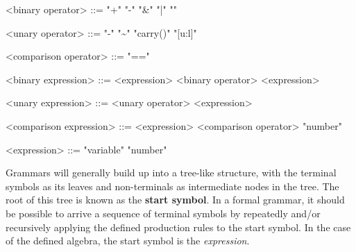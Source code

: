 \setlength{\grammarparsep}{0.25cm}   %
\setlength{\grammarindent}{4.5cm}
\begin{center}
\begin{grammar}
    <binary operator> ::= "+" \alt "-" \alt "\&" \alt "|" \alt "\bigoplus"

    <unary operator> ::= "-" \alt "\sim" \alt "carry()" \alt "[u:l]"

    <comparison operator> ::= "=="
    
    <binary expression> ::= <expression> <binary operator> <expression>
    
    <unary expression> ::= <unary operator> <expression>
    
    <comparison expression> ::= <expression> <comparison operator> "number"
    
    <expression> ::= "variable" \alt "number"   
\end{grammar}
\end{center}
Grammars will generally build up into a tree-like structure, with the terminal symbols as its leaves and non-terminals as intermediate nodes in the tree. The root of this tree is known as the \textbf{start symbol}. In a formal grammar, it should be possible to arrive a sequence of terminal symbols by repeatedly and/or recursively applying the defined production rules to the start symbol. In the case of the defined algebra, the start symbol is the \textit{expression}.
        
